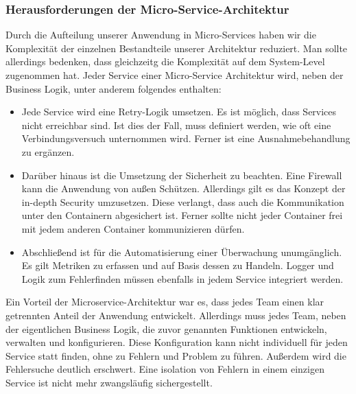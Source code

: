 \subsubsection{Herausforderungen der Micro-Service-Architektur}
Durch die Aufteilung unserer Anwendung in Micro-Services haben wir die Komplexität der einzelnen Bestandteile unserer Architektur reduziert. Man sollte allerdings bedenken, dass gleichzeitg die Komplexität auf dem System-Level zugenommen hat. Jeder Service einer Micro-Service Architektur wird, neben der Business Logik, unter anderem folgendes enthalten:
\begin{itemize}
    \item Jede Service wird eine Retry-Logik umsetzen. Es ist möglich, dass Services nicht erreichbar sind. Ist dies der Fall, muss definiert werden, wie oft eine Verbindungsversuch unternommen wird. Ferner ist eine Ausnahmebehandlung zu ergänzen.
    \item Darüber hinaus ist die Umsetzung der Sicherheit zu beachten. Eine Firewall kann die Anwendung von außen Schützen. Allerdings gilt es das Konzept der in-depth Security umzusetzen. Diese verlangt, dass auch die Kommunikation unter den Containern abgesichert ist. Ferner sollte nicht jeder Container frei mit jedem anderen Container kommunizieren dürfen.
    \item Abschließend ist für die Automatisierung einer Überwachung unumgänglich. Es gilt Metriken zu erfassen und auf Basis dessen zu Handeln. Logger und Logik zum Fehlerfinden müssen ebenfalls in jedem Service integriert werden.
\end{itemize}
Ein Vorteil der Microservice-Architektur war es, dass jedes Team einen klar getrennten Anteil der Anwendung entwickelt. Allerdings muss jedes Team, neben der eigentlichen Business Logik, die zuvor genannten Funktionen entwickeln, verwalten und konfigurieren. Diese Konfiguration kann nicht individuell für jeden Service statt finden, ohne zu Fehlern und Problem zu führen. Außerdem wird die Fehlersuche deutlich erschwert. Eine isolation von Fehlern in einem einzigen Service ist nicht mehr zwangsläufig sichergestellt.

